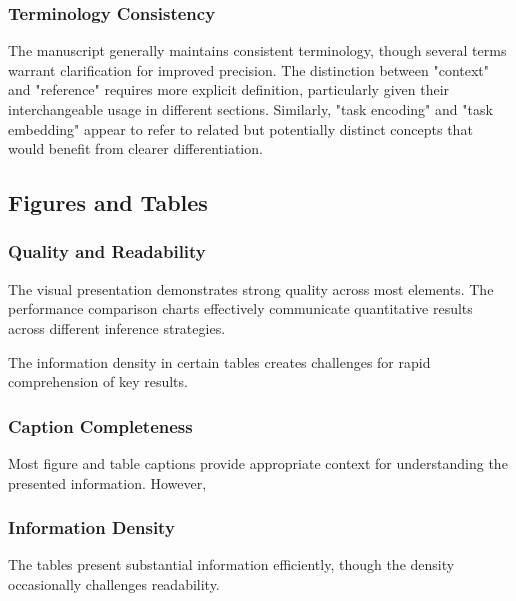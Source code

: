 \subsubsection{Terminology Consistency}
The manuscript generally maintains consistent terminology, though several terms warrant clarification for improved precision. The distinction between "context" and "reference" requires more explicit definition, particularly given their interchangeable usage in different sections. Similarly, "task encoding" and "task embedding" appear to refer to related but potentially distinct concepts that would benefit from clearer differentiation. 

\subsection{Figures and Tables}
\subsubsection{Quality and Readability}
The visual presentation demonstrates strong quality across most elements.  The performance comparison charts effectively communicate quantitative results across different inference strategies. 

 The information density in certain tables creates challenges for rapid comprehension of key results.

\subsubsection{Caption Completeness}
Most figure and table captions provide appropriate context for understanding the presented information.  However, 

\subsubsection{Information Density}
The tables present substantial information efficiently, though the density occasionally challenges readability. 

